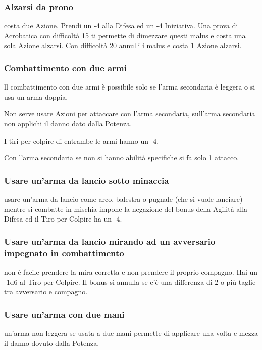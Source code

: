 \documentclass[a4paper,11pt,twoside,openany]{book}
\begin{document}
\subsubsection{Alzarsi da prono} costa due Azione. Prendi un -4 alla Difesa ed un -4 Iniziativa. Una prova di Acrobatica con difficoltà 15 ti permette di dimezzare questi malus e costa una sola Azione alzarsi. Con difficoltà 20 annulli i malus e costa 1 Azione alzarsi.

\subsubsection{Combattimento con due armi} ll combattimento con due armi è possibile solo se l'arma secondaria è leggera o si usa un arma doppia.

Non serve usare Azioni per attaccare con l'arma secondaria, sull'arma secondaria non applichi il danno dato dalla Potenza.

I tiri per colpire di entrambe le armi hanno un -4.

Con l'arma secondaria se non si hanno abilità specifiche si fa solo 1 attacco.

\subsubsection{Usare un'arma da lancio sotto minaccia} usare un'arma da lancio come arco, balestra o pugnale (che si vuole lanciare) mentre si combatte in mischia impone la negazione del bonus della Agilità alla Difesa ed il Tiro per Colpire ha un -4.

\subsubsection{Usare un'arma da lancio mirando ad un avversario impegnato
in combattimento} non è facile prendere la mira corretta e non prendere il proprio compagno.
Hai un -1d6 al Tiro per Colpire. Il bonus si annulla se c'è una differenza di 2 o più taglie tra avversario e compagno.

\subsubsection{Usare un'arma con due mani} un'arma non leggera se usata a due mani permette di applicare una volta e mezza il danno dovuto dalla Potenza.
\end{document}
